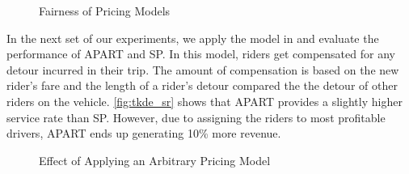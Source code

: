 \begin{figure}[h!]
	\centering
    \vspace{-0.15in}
    \caption{Fairness of Pricing Models}
    \label{fig:fairness}
\end{figure}

In the next set of our experiments, we apply the model in \cite{Ma15} and evaluate the performance of APART and SP. In this model, riders get compensated for any detour incurred in their trip. The amount of compensation is based on the new rider's fare and the length of a rider's detour compared the the detour of other riders on the vehicle. \cref{fig:tkde_sr} shows that APART provides a slightly higher service rate than SP. However, due to assigning the riders to most profitable drivers, APART ends up generating 10\% more revenue.

\begin{figure}[h]
	\centering
    \vspace{-0.15in}
    \caption{Effect of Applying an Arbitrary Pricing Model}
    \label{fig:tkde}
\end{figure}

